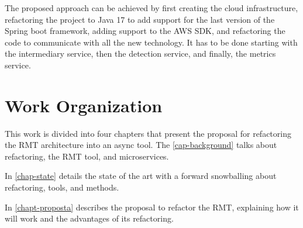 The proposed approach can be achieved by first creating the cloud infrastructure, refactoring the project to Java 17 to add support for the last version of the Spring boot framework, adding support to the AWS SDK, and refactoring the code to communicate with all the new technology. It has to be done starting with the intermediary service, then the detection service, and finally, the metrics service.
\section{Work Organization}

This work is divided into four chapters that present the proposal for refactoring the RMT architecture into an async tool. The \cref{cap-background} talks about refactoring, the RMT tool, and microservices.

In \cref{chap-state} details the state of the art with a forward snowballing about refactoring, tools, and methods.

In \cref{chapt-proposta} describes the proposal to refactor the RMT, explaining how it will work and the advantages of its refactoring.